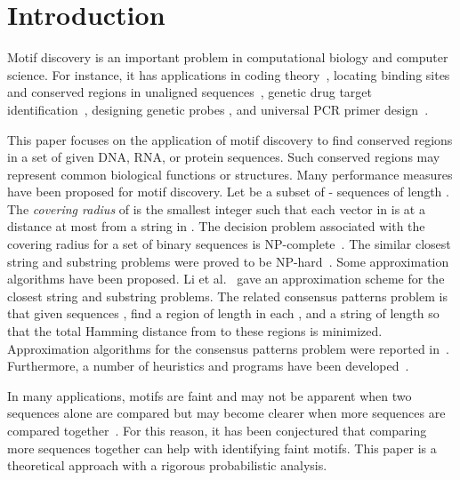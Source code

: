 \documentclass[11pt]{article}
\begin{document}
\newpage

\section{Introduction}
Motif discovery is an important problem in computational biology and
computer science. For instance, it has applications in coding
theory~\cite{FrancesLitman97,GasieniecJanssonLingas99}, locating
binding sites and conserved regions in unaligned
sequences~\cite{StormoHartzell91,LawrenceReilly90,HertzStormo94,Stormo90},
genetic drug target identification~\cite{LanctotLiMaWangZhang99},
designing genetic probes \cite{LanctotLiMaWangZhang99}, and
universal PCR primer
design~\cite{LucasBusch91,DopazoSobrino93,ProutskiHolme96,LanctotLiMaWangZhang99}.


This paper focuses on the application of motif discovery to find
conserved regions in a set of given DNA, RNA, or protein sequences.
Such conserved regions may represent common biological functions or
structures. Many performance measures have been proposed for motif
discovery. Let  be a subset of - sequences of length .
The {\it covering radius} of  is the smallest integer  such
that each vector in  is at a distance at most  from a
string in . The decision problem associated with the covering
radius for a set of binary sequences is
NP-complete~\cite{FrancesLitman97}. The similar closest string and
substring problems were proved to be
NP-hard~\cite{FrancesLitman97,LanctotLiMaWangZhang99}.
Some approximation algorithms have been proposed.
  Li et
al.~\cite{LiMaWang99} gave an approximation scheme for the closest
string and substring problems. The related consensus patterns
problem is that given  sequences , find a region
of length  in each , and a string  of length  so that
the total Hamming distance from  to these regions is minimized.
Approximation algorithms for the consensus patterns problem were
reported in~\cite{LiMaWang99b}. Furthermore, a number  of heuristics
and programs have been
developed~\cite{PevznerSze00,KeichPevzner02,KeichPevzner02b,WangDong05,ChinLeung05}.



In many applications,  motifs are faint and may not be apparent when
two sequences alone are compared but may become clearer when  more
sequences are compared together~\cite{Gusfield97}.
For this reason, it has been conjectured that comparing more
sequences together can help with identifying faint motifs.
This paper is a theoretical approach with a rigorous probabilistic
analysis.
\end{document}
